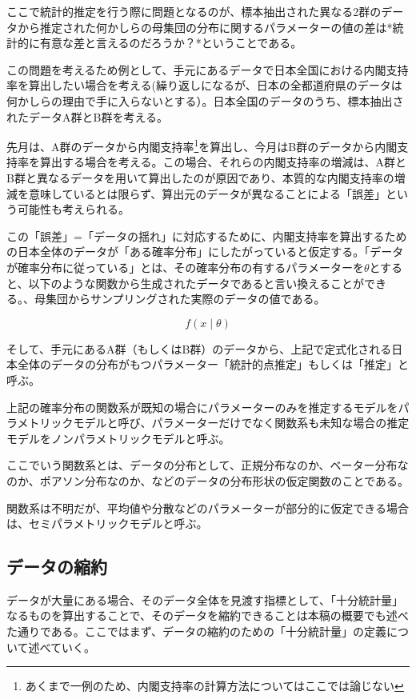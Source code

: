 \documentclass[a4paper,uplatex]{jsarticle}
\begin{document}
ここで統計的推定を行う際に問題となるのが、標本抽出された異なる2群のデータから推定された何かしらの母集団の分布に関するパラメーターの値の差は*統計的に有意な差と言えるのだろうか？*ということである。

この問題を考えるため例として、手元にあるデータで日本全国における内閣支持率を算出したい場合を考える(繰り返しになるが、日本の全都道府県のデータは何かしらの理由で手に入らないとする）。日本全国のデータのうち、標本抽出されたデータA群とB群を考える。

先月は、A群のデータから内閣支持率\footnote{あくまで一例のため、内閣支持率の計算方法についてはここでは論じない}を算出し、今月はB群のデータから内閣支持率を算出する場合を考える。この場合、それらの内閣支持率の増減は、A群とB群と異なるデータを用いて算出したのが原因であり、本質的な内閣支持率の増減を意味しているとは限らず、算出元のデータが異なることによる「誤差」という可能性も考えられる。

この「誤差」=「データの揺れ」に対応するために、内閣支持率を算出するための日本全体のデータが「ある確率分布」にしたがっていると仮定する。「データが確率分布に従っている」とは、その確率分布の有するパラメーターを$\theta$とすると、以下のような関数から生成されたデータであると言い換えることができる。、母集団からサンプリングされた実際のデータの値である。

\begin{equation}
f(x \mid \theta)
\end{equation}

そして、手元にあるA群（もしくはB群）のデータから、上記で定式化される日本全体のデータの分布がもつパラメーター「統計的点推定」もしくは「推定」と呼ぶ。

上記の確率分布の関数系が既知の場合にパラメーターのみを推定するモデルをパラメトリックモデルと呼び、パラメーターだけでなく関数系も未知な場合の推定モデルをノンパラメトリックモデルと呼ぶ。

ここでいう関数系とは、データの分布として、正規分布なのか、ベーター分布なのか、ポアソン分布なのか、などのデータの分布形状の仮定関数のことである。

関数系は不明だが、平均値や分散などのパラメーターが部分的に仮定できる場合は、セミパラメトリックモデルと呼ぶ。


\subsection{データの縮約}

データが大量にある場合、そのデータ全体を見渡す指標として、「十分統計量」なるものを算出することで、そのデータを縮約できることは本稿の概要でも述べた通りである。ここではまず、データの縮約のための「十分統計量」の定義について述べていく。
\end{document}

